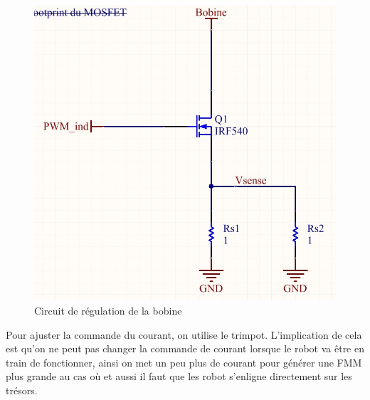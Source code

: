   \begin{figure}[H]
    \label{drive}
    \centering
    \includegraphics[scale=0.3]{resources/drivemosfet.jpg}
    \caption{Circuit de régulation de la bobine}
  \end{figure}


Pour ajuster la commande du courant, on utilise le trimpot. L'implication de cela est qu'on ne peut pas changer la commande de courant
lorsque le robot va être en train de fonctionner, ainsi on met un peu plus de courant pour générer une FMM plus grande au cas où et aussi il faut que les robot s'enligne directement sur les trésors.
